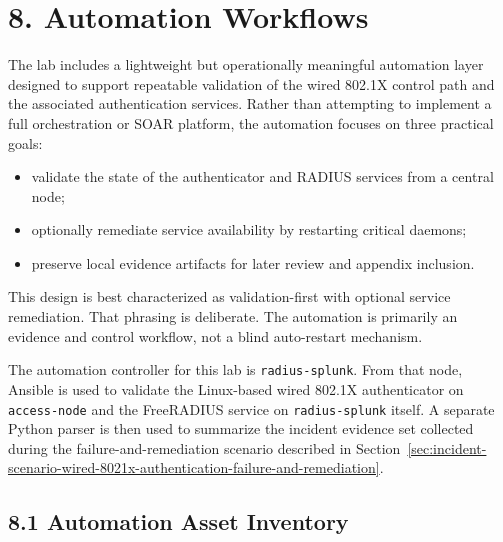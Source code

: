 \documentclass[11pt]{article}
\begin{document}
\section{8. Automation Workflows}
\label{sec:automation-workflows}

The lab includes a lightweight but operationally meaningful automation layer designed to support repeatable validation of the wired 802.1X control path and the associated authentication services. Rather than attempting to implement a full orchestration or SOAR platform, the automation focuses on three practical goals:

\begin{itemize}
    \item validate the state of the authenticator and RADIUS services from a central node;
    \item optionally remediate service availability by restarting critical daemons;
    \item preserve local evidence artifacts for later review and appendix inclusion.
\end{itemize}

This design is best characterized as validation-first with optional service remediation. That phrasing is deliberate. The automation is primarily an evidence and control workflow, not a blind auto-restart mechanism.

The automation controller for this lab is \texttt{radius-splunk}. From that node, Ansible is used to validate the Linux-based wired 802.1X authenticator on \texttt{access-node} and the FreeRADIUS service on \texttt{radius-splunk} itself. A separate Python parser is then used to summarize the incident evidence set collected during the failure-and-remediation scenario described in Section~\ref{sec:incident-scenario-wired-8021x-authentication-failure-and-remediation}.


\subsection{8.1 Automation Asset Inventory}
\label{sec:automation-asset-inventory}
\end{document}

